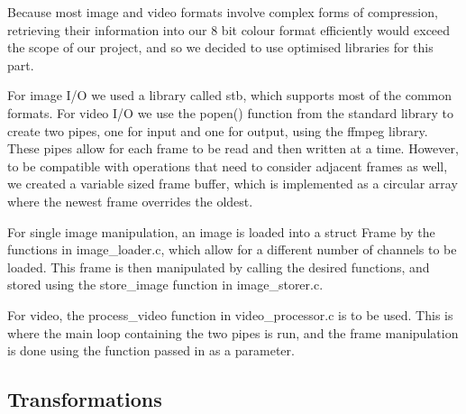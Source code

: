 \documentclass[11pt]{article}
\begin{document}
Because most image and video formats involve complex forms of compression, retrieving their information into our 8 bit colour format efficiently would exceed the scope of our project, and so we decided to use optimised libraries for this part.

For image I/O we used a library called stb, which supports most of the common formats. For video I/O we use the popen() function from the standard library to create two pipes, one for input and one for output, using the ffmpeg library. These pipes allow for each frame to be read and then written at a time. However, to be compatible with operations that need to consider adjacent frames as well, we created a variable sized frame buffer, which is implemented as a circular array where the newest frame overrides the oldest.

For single image manipulation, an image is loaded into a struct Frame by the functions in image\_loader.c, which allow for a different number of channels to be loaded. This frame is then manipulated by calling the desired functions, and stored using the store\_image function in image\_storer.c.

For video, the process\_video function in video\_processor.c is to be used. This is where the main loop containing the two pipes is run, and the frame manipulation is done using the function passed in as a parameter.

  \subsection*{Transformations}
\end{document}
